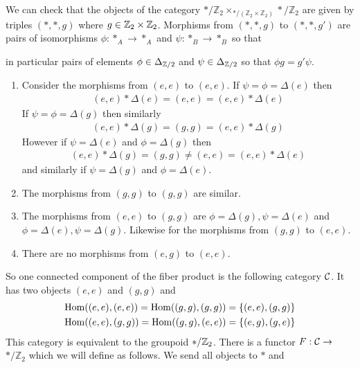 \documentclass[12pt]{article}
\begin{document}
We can check that the objects of the category $*/\mathbb{Z}_2 \times_{*/(\mathbb{Z}_2 \times \mathbb{Z}_2)} */\mathbb{Z}_2$ are given by triples $(*,*,g)$ where $g \in \mathbb{Z}_2 \times \mathbb{Z}_2$. Morphisms from $(\ast, \ast, g)$ to $(\ast, \ast, g')$ are pairs of isomorphisms $\phi: *_A \to *_A$ and $\psi: *_B \to *_B$ so that \begin{center}
\end{center} in particular pairs of elements $\phi \in \Delta_{\mathbb{Z}/2}$ and $\psi \in \Delta_{\mathbb{Z}/2}$ so that $\phi g = g' \psi$.
\begin{enumerate}
    \item Consider the morphisms from $(e,e)$ to $(e,e)$. If $\psi = \phi = \Delta(e)$ then \begin{align*}
              (e,e) * \Delta(e) = (e,e) = (e,e) * \Delta(e)
          \end{align*} If $\psi = \phi = \Delta(g)$ then similarly \begin{align*}
              (e,e) * \Delta(g) = (g,g) = (e,e) * \Delta(g)
          \end{align*} However if $\psi = \Delta(e)$ and $\phi = \Delta(g)$ then \begin{align*}
              (e,e) * \Delta(g) = (g,g) \neq (e,e) = (e,e) * \Delta(e)
          \end{align*} and similarly if $\psi = \Delta(g)$ and $\phi = \Delta(e)$.
    \item The morphisms from $(g,g)$ to $(g,g)$ are similar.
    \item The morphisms from $(e,e)$ to $(g,g)$ are $\phi = \Delta(g), \psi = \Delta(e)$ and $\phi = \Delta(e), \psi = \Delta(g)$. Likewise for the morphisms from $(g,g)$ to $(e,e)$.
    \item There are no morphisms from $(e,g)$ to $(e,e)$.
\end{enumerate} So one connected component of the fiber product is the following category $\cal C$. It has two objects $(e,e)$ and $(g,g)$ and \begin{align*}
    \operatorname{Hom}((e,e),(e,e)) = \operatorname{Hom}((g,g),(g,g)) = \{(e,e), (g,g)\} \\
    \operatorname{Hom}((e,e),(g,g)) = \operatorname{Hom}((g,g),(e,e)) = \{(e,g), (g,e)\}
\end{align*} This category is equivalent to the groupoid $*/\mathbb{Z}_2$. There is a functor $F:\cal{C} \to $ $*/\mathbb{Z}_2$ which we will define as follows. We send all objects to $*$ and \begin{align*}

\end{align*}
\end{document}
